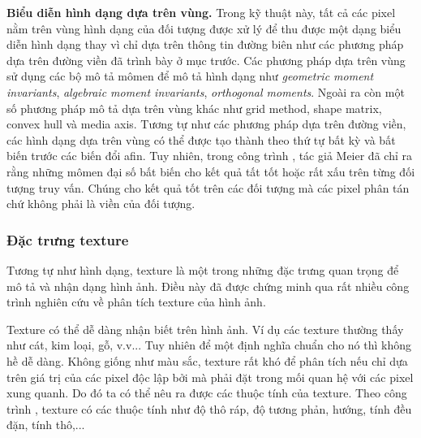 \textbf{Biểu diễn hình dạng dựa trên vùng.} Trong kỹ thuật này, tất cả các pixel nằm trên vùng hình dạng của đối tượng được xử lý để thu được một dạng biểu diễn hình dạng thay vì chỉ dựa trên thông tin đường biên như các phương pháp dựa trên đường viền đã trình bày ở mục trước. Các phương pháp dựa trên vùng sử dụng các bộ mô tả mômen để mô tả hình dạng như \textit{geometric moment invariants}\cite{hu1962visual}, \textit{algebraic moment invariants}\cite{taubin1991recognition, taubin1991object}, \textit{orthogonal moments}\cite{teague1980image}. Ngoài ra còn một số phương pháp mô tả dựa trên vùng khác như grid method, shape matrix, convex hull và media axis. Tương tự như các phương pháp dựa trên đường viền, các hình dạng dựa trên vùng có thể được tạo thành theo thứ tự bất kỳ và bất biến trước các biến đổi afin. Tuy nhiên, trong công trình \cite{meier1998automatic}, tác giả Meier đã chỉ ra rằng những mômen đại số bất biến cho kết quả tất tốt hoặc rất xấu trên từng đối tượng truy vấn. Chúng cho kết quả tốt trên các đối tượng mà các pixel phân tán chứ không phải là viền của đối tượng.

\subsubsection{Đặc trưng texture}
Tương tự như hình dạng, texture là một trong những đặc trưng quan trọng để mô tả và nhận dạng hình ảnh. Điều này đã được chứng minh qua rất nhiều công trình nghiên cứu về phân tích texture của hình ảnh\cite{tuceryan1998texture, manjunath1996texture, montoya2009wavelet, xu2006evaluation}.

Texture có thể dễ dàng nhận biết trên hình ảnh. Ví dụ các texture thường thấy như cát, kim loại, gỗ, v.v... Tuy nhiên để một định nghĩa chuẩn cho nó thì không hề dễ dàng. Không giống như màu sắc, texture rất khó để phân tích nếu chỉ dựa trên giá trị của các pixel độc lập bởi  mà phải đặt trong mối quan hệ với các pixel xung quanh. Do đó ta có thể nêu ra được các thuộc tính của texture. Theo công trình \cite{tamura1978textural}, texture có các thuộc tính như độ thô ráp, độ tương phản, hướng, tính đều đặn, tính thô,...

